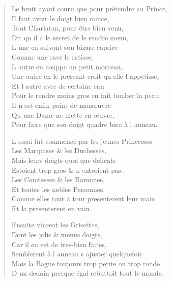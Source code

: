 \begin{verse}
Le bruit ayant couru que pour prétendre au Prince, \\
\vin Il faut avoir le doigt bien mince, \\
\vin Tout Charlatan, pour être bien venu, \\
Dit qu\textquotesingle{} il a le secret de le rendre menu, \\
\vin L\textquotesingle{} une en suivant son bizare caprice \\
\vin Comme une rave le ratisse, \\
\vin L\textquotesingle{} autre en couppe un petit morceau, \\
Une autre en le pressant croit qu\textquotesingle{} elle l\textquotesingle{} appetisse, \\
\vin Et l\textquotesingle{} autre avec de certaine eau \\
Pour le rendre moins gros en fait tomber la peau; \\
\vin Il n\textquotesingle{} est enfin point de manœuvre \\
\vin Qu\textquotesingle{} une Dame ne mette en œuvre, \\
Pour faire que son doigt quadre bien à l\textquotesingle{} anneau.

L\textquotesingle{} essai fut commencé par les jeunes Princesses \\
\vin Les Marquises \& les Duchesses, \\
\vin Mais leurs doigts quoi que delicats \\
\vin Estoient trop gros \& n\textquotesingle{} entroient pas. \\
\vin Les Comtesses \& les Baronnes, \\
\vin Et toutes les nobles Personnes, \\
Comme elles tour à tour presenterent leur main \\
\vin Et la presenterent en vain.

\vin Ensuite vinrent les Grisettes, \\
\vin Dont les jolis \& menus doigts, \\
\vin Car il en est de tres-bien faites, \\
Semblerent à l\textquotesingle{} anneau s\textquotesingle{} ajuster quelquefois \\
Mais la Bague toujours trop petite ou trop ronde \\
D\textquotesingle{} un dedain presque égal rebuttoit tout le monde.


\end{verse}
